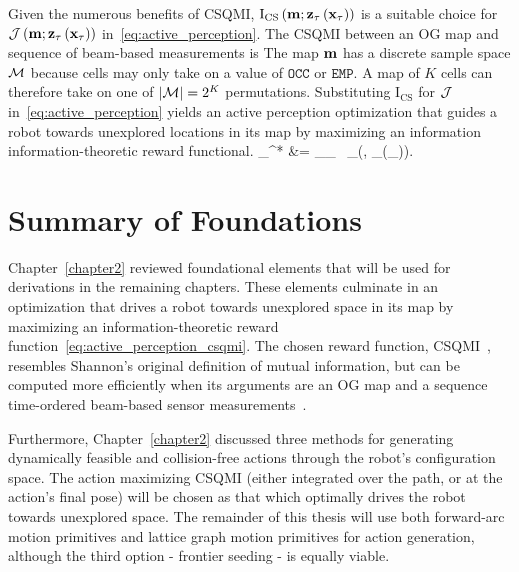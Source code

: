 Given the numerous benefits of CSQMI, $\text{I}_{\text{CS}}\left(\mathbf{m};\mathbf{z}_{\mathbf{\tau}}\left(\mathbf{x}_{\mathbf{\tau}}\right)\right)$
is a suitable choice
for $\mathcal{J}\left(\mathbf{m}; \mathbf{z}_{\mathbf{\tau}}\left(\mathbf{x}_{\mathbf{\tau}}\right)\right)$
in~\eqref{eq:active_perception}. The CSQMI between an OG map and sequence of
beam-based measurements is
%
%
The map $\mathbf{m}$ has a discrete sample space $\mathcal{M}$ because cells may
only take on a value of $\texttt{OCC}$ or $\texttt{EMP}$. A map of $K$ cells
can therefore take on one of $\vert \mathcal{M} \vert = 2^{K}$ permutations.
Substituting $\text{I}_{\text{CS}}$ for $\mathcal{J}$ in~\eqref{eq:active_perception}
yields an active perception optimization that guides a robot towards unexplored
locations in its map by maximizing an information information-theoretic reward functional.
%
\eq
{
 _{\mbf{\tau}}^{*}
 &=
 \argmax_{_{\mbf{\tau}} \in {}}
 \
 _{}\left(,
 _{\mbf{\tau}}(_{\mbf{\tau}})\right).
 \label{eq:active_perception_csqmi}
}

\section{Summary of Foundations}

Chapter~\ref{chapter2} reviewed foundational elements that will be used for
derivations in the remaining chapters. These elements culminate in an
optimization that drives a robot towards unexplored space in its map by
maximizing an information-theoretic reward
function~\eqref{eq:active_perception_csqmi}. The chosen reward function,
CSQMI~\cite{principe2010information},
resembles Shannon's original definition of mutual information, but can be computed
more efficiently when its arguments are an OG map and a sequence
time-ordered beam-based sensor measurements~\cite{charrow2015icra}.

Furthermore, Chapter~\ref{chapter2} discussed three methods for generating
dynamically feasible and collision-free actions through the robot's
configuration space. The action maximizing CSQMI (either integrated over the
path, or at the action's final pose) will be chosen as that which optimally
drives the robot towards unexplored space. The remainder of this thesis will use both forward-arc
motion primitives and lattice graph motion primitives for action generation,
although the third option - frontier seeding - is equally viable.
